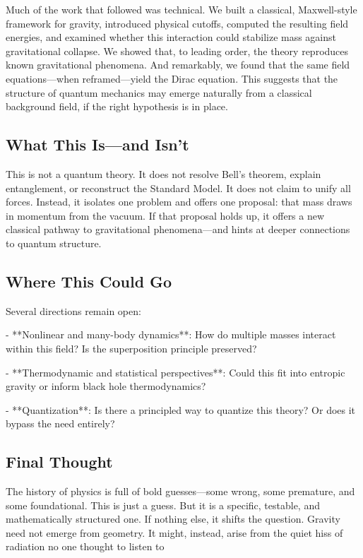 \documentclass {article}
\begin{document}
Much of the work that followed was technical. We built a classical, Maxwell-style framework for gravity, introduced physical cutoffs, computed the resulting field energies, and examined whether this interaction could stabilize mass against gravitational collapse. We showed that, to leading order, the theory reproduces known gravitational phenomena. And remarkably, we found that the same field equations—when reframed—yield the Dirac equation. This suggests that the structure of quantum mechanics may emerge naturally from a classical background field, if the right hypothesis is in place.

\subsection{What This Is—and Isn’t}

This is not a quantum theory. It does not resolve Bell’s theorem, explain entanglement, or reconstruct the Standard Model. It does not claim to unify all forces. Instead, it isolates one problem and offers one proposal: that mass draws in momentum from the vacuum. If that proposal holds up, it offers a new classical pathway to gravitational phenomena—and hints at deeper connections to quantum structure.


\subsection{Where This Could Go}

Several directions remain open:

- **Nonlinear and many-body dynamics**: How do multiple masses interact within this field? Is the superposition principle preserved?

- **Thermodynamic and statistical perspectives**: Could this fit into entropic gravity or inform black hole thermodynamics?

- **Quantization**: Is there a principled way to quantize this theory? Or does it bypass the need entirely?

\subsection{Final Thought}

The history of physics is full of bold guesses—some wrong, some premature, and some foundational. This is just a guess. But it is a specific, testable, and mathematically structured one. If nothing else, it shifts the question. Gravity need not emerge from geometry. It might, instead, arise from the quiet hiss of radiation no one thought to listen to
\end{document}

